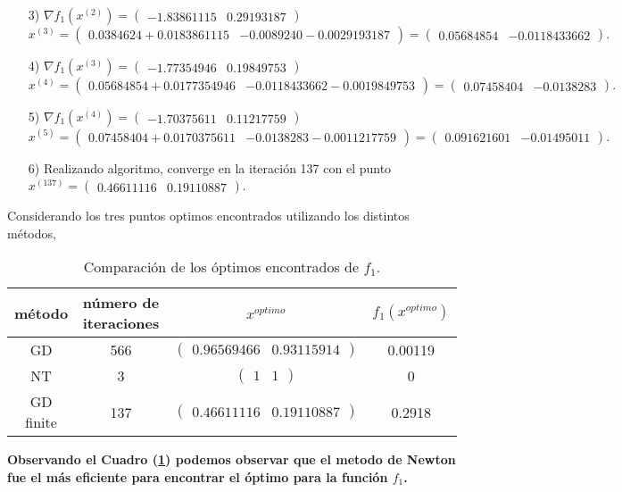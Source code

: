 \documentclass[11pt,letterpaper]{article}
\begin{document}
\begin{enumerate}
\begin{enumerate}
\item[3)] $\nabla f_1(x^{(2)})=\begin{pmatrix}
-1.83861115 & 0.29193187
\end{pmatrix}$\\
$x^{(3)}= \begin{pmatrix}
0.0384624+0.0183861115& -0.0089240-0.0029193187
\end{pmatrix}=\begin{pmatrix}
0.05684854 & -0.0118433662
\end{pmatrix}.$
\item[4)] $\nabla f_1(x^{(3)})=\begin{pmatrix}
-1.77354946 & 0.19849753
\end{pmatrix}$\\
$x^{(4)}= \begin{pmatrix}
0.05684854+0.0177354946 & -0.0118433662-0.0019849753
\end{pmatrix}=\begin{pmatrix}
0.07458404 & -0.0138283
\end{pmatrix}.$
\item[5)] $\nabla f_1(x^{(4)})=\begin{pmatrix}
-1.70375611 & 0.11217759
\end{pmatrix}$\\
$x^{(5)}= \begin{pmatrix}
0.07458404+0.0170375611 & -0.0138283-0.0011217759
\end{pmatrix}=\begin{pmatrix}
0.091621601 & -0.01495011
\end{pmatrix}.$
\item[6)] Realizando algoritmo, converge en la iteración 137 con el punto $x^{(137)}=\begin{pmatrix}
0.46611116 & 0.19110887
\end{pmatrix}$.
\end{enumerate}
Considerando los tres puntos optimos encontrados utilizando los distintos métodos,

\begin{table}[h]\label{funcion1}
\centering
\begin{tabular}{c|c|c|c}
\hline \hline
método &número de iteraciones &$x^{optimo}$ & $f_1(x^{optimo})$ \\ \hline \hline
GD &566 &$\begin{pmatrix}
0.96569466 & 0.93115914
\end{pmatrix}$ & 0.00119\\
NT &3&$\begin{pmatrix}
1 & 1
\end{pmatrix}$ & 0\\
GD finite & 137&$\begin{pmatrix}
0.46611116 & 0.19110887
\end{pmatrix}$ & 0.2918\\ \hline \hline
\end{tabular}
\caption{Comparación de los óptimos encontrados de $f_1$.}
\end{table}
\textbf{Observando el Cuadro (\ref{funcion1}) podemos observar que el metodo de Newton fue el más eficiente para encontrar el óptimo para la función $f_1$.}


\end{enumerate}
\end{document}
